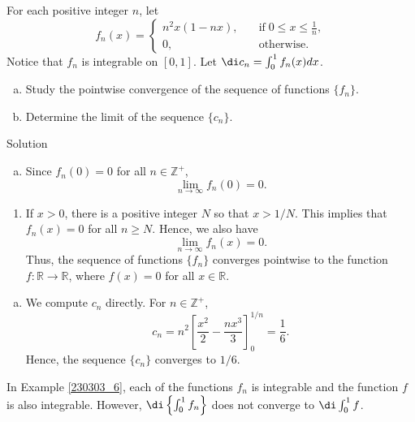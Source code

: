 \begin{example}[label=230303_6]{}
 For each positive integer $n$, let 
 \[f_n(x)=\begin{cases} n^2x(1-nx),\quad &\text{if}\;0\leq x\leq \frac{1}{n},\\0,\quad  &\text{otherwise}.\end{cases}\] Notice that $f_n$ is integrable on $[0,1]$. Let
$\di c_n=\int_0^1f_n(x)dx$. 
 \begin{enumerate}[(a)]
 \item Study the pointwise convergence of the sequence of functions $\{f_n\}$.
\item Determine the limit of the sequence $\{c_n\}$.
\end{enumerate}
\end{example}
\begin{solution}{Solution}
\begin{enumerate}[(a)]
\item  Since $f_n(0)=0$ for all $n\in\mathbb{Z}^+$,
\[
\lim_{n\to\infty}f_n(0)=0.
\]
\end{enumerate}\bs \begin{enumerate}[]\item
If $x>0$, there is  a positive integer $N$ so that $x>1/N$. This implies that $f_n(x)=0$ for all $n\geq N$. Hence, we also have 
\[
\lim_{n\to\infty}f_n(x)=0.
\]Thus, the sequence of functions $\{f_n\}$ converges pointwise to the function $f:\mathbb{R}\to\mathbb{R}$, where $f(x)=0$ for all $x\in\mathbb{R}$.\end{enumerate}\begin{enumerate}[(b)]
\item We compute $c_n$ directly. For $n\in\mathbb{Z}^+$,
\[c_n=n^2\left[\frac{x^2}{2}-\frac{nx^3}{3}\right]_0^{1/n}=\frac{1}{6}.\]
Hence, the sequence $\{c_n\}$ converges to $1/6$.
\end{enumerate}
\end{solution}
\begin{highlight}{}
In Example \ref{230303_6},   each of the functions $f_n$ is integrable and the  function $f$ is also integrable. However, $\di\left\{\int_0^1f_n\right\}$ does not converge to $\di\int_0^1f$. 

\end{highlight}
